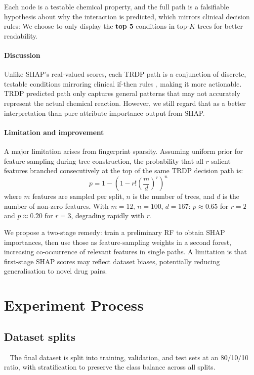 \documentclass[letterpaper]{article} %
\begin{document}
Each node is a testable chemical property, and the full path is a falsifiable hypothesis about why the interaction is predicted, which mirrors clinical decision rules\cite{Rudin2019}:  We choose to only display the \textbf{top 5} conditions in top-$K$ trees for better readability.

\paragraph{Discussion}
Unlike SHAP's real-valued scores, each TRDP path is a conjunction of discrete, testable conditions mirroring clinical if-then rules \cite{Rudin2019}, making it more actionable. TRDP predicted path only captures general patterns that may not accurately represent the actual chemical reaction. However, we still regard that as a better interpretation than pure attribute importance output from SHAP.

\paragraph{Limitation and improvement}

A major limitation arises from fingerprint sparsity. Assuming uniform prior for feature sampling during tree construction, the probability that all $r$ salient features branched consecutively at the top of the same TRDP decision path is:
\begin{equation}
   p = 1 - \left(1 - r! \left(\frac{m}{d}\right)^{r}\right)^{n}
\end{equation}
where $m$ features are sampled per split, $n$ is the number of trees, and $d$ is the number of non-zero features. With $m=12$, $n=100$, $d=167$: $p\approx0.65$ for $r=2$ and $p\approx0.20$ for $r=3$, degrading rapidly with $r$.

We propose a two-stage remedy: train a preliminary RF to obtain SHAP importances, then use those as feature-sampling weights in a second forest, increasing co-occurrence of relevant features in single paths. A limitation is that first-stage SHAP scores may reflect dataset biases, potentially reducing generalisation to novel drug pairs.

\section{Experiment Process}

\subsection{Dataset splits}
\ 
\newline
The final dataset is split into training, validation, and test sets at an 80/10/10 ratio, with stratification to preserve the class balance across all splits.
\end{document}
